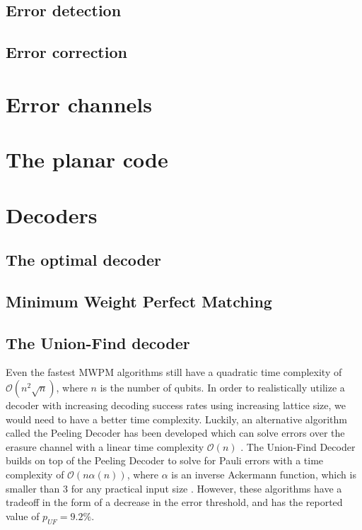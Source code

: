 \subsection{Error detection}
\subsection{Error correction}


\section{Error channels}\label{sec:surface_error}

\section{The planar code}\label{sec:surface_planar}

\begin{figure}
  \centering
\end{figure}

\section{Decoders}\label{sec:surface_decoders}
\subsection{The optimal decoder}
\subsection{Minimum Weight Perfect Matching}
\subsection{The Union-Find decoder}

Even the fastest MWPM algorithms still have a quadratic time complexity of $\mathcal{O}(n^2\sqrt{n})$, where $n$ is the number of qubits. In order to realistically utilize a decoder with increasing decoding success rates using increasing lattice size, we would need to have a better time complexity. Luckily, an alternative algorithm called the Peeling Decoder has been developed which can solve errors over the erasure channel with a linear time complexity $\mathcal{O}(n)$ \cite{delfosse2017}. The Union-Find Decoder builds on top of the Peeling Decoder to solve for Pauli errors with a time complexity of $\mathcal{O}(n\alpha(n))$, where $\alpha$ is an inverse Ackermann function, which is smaller than 3 for any practical input size \cite{nickerson2017}. However, these algorithms have a tradeoff in the form of a decrease in the error threshold, and has the reported value of $p_{UF} = 9.2\%$.


